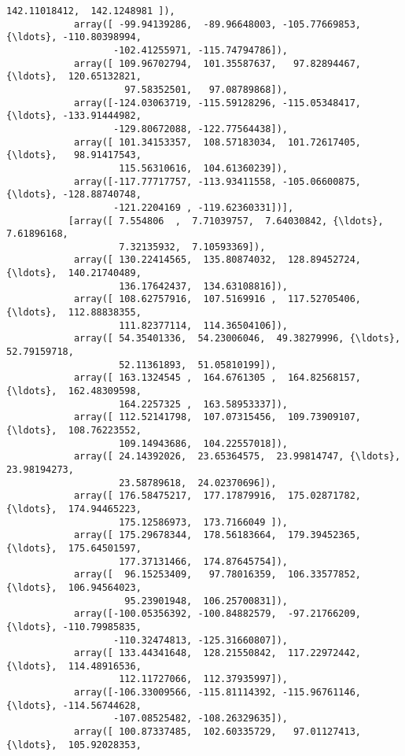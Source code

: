 \documentclass[11pt]{article}
\begin{document}
\begin{Verbatim}[commandchars=\\\{\}]
                    142.11018412,  142.1248981 ]),
            array([ -99.94139286,  -89.96648003, -105.77669853, {\ldots}, -110.80398994,
                   -102.41255971, -115.74794786]),
            array([ 109.96702794,  101.35587637,   97.82894467, {\ldots},  120.65132821,
                     97.58352501,   97.08789868]),
            array([-124.03063719, -115.59128296, -115.05348417, {\ldots}, -133.91444982,
                   -129.80672088, -122.77564438]),
            array([ 101.34153357,  108.57183034,  101.72617405, {\ldots},   98.91417543,
                    115.56310616,  104.61360239]),
            array([-117.77717757, -113.93411558, -105.06600875, {\ldots}, -128.88740748,
                   -121.2204169 , -119.62360331])],
           [array([ 7.554806  ,  7.71039757,  7.64030842, {\ldots},  7.61896168,
                    7.32135932,  7.10593369]),
            array([ 130.22414565,  135.80874032,  128.89452724, {\ldots},  140.21740489,
                    136.17642437,  134.63108816]),
            array([ 108.62757916,  107.5169916 ,  117.52705406, {\ldots},  112.88838355,
                    111.82377114,  114.36504106]),
            array([ 54.35401336,  54.23006046,  49.38279996, {\ldots},  52.79159718,
                    52.11361893,  51.05810199]),
            array([ 163.1324545 ,  164.6761305 ,  164.82568157, {\ldots},  162.48309598,
                    164.2257325 ,  163.58953337]),
            array([ 112.52141798,  107.07315456,  109.73909107, {\ldots},  108.76223552,
                    109.14943686,  104.22557018]),
            array([ 24.14392026,  23.65364575,  23.99814747, {\ldots},  23.98194273,
                    23.58789618,  24.02370696]),
            array([ 176.58475217,  177.17879916,  175.02871782, {\ldots},  174.94465223,
                    175.12586973,  173.7166049 ]),
            array([ 175.29678344,  178.56183664,  179.39452365, {\ldots},  175.64501597,
                    177.37131466,  174.87645754]),
            array([  96.15253409,   97.78016359,  106.33577852, {\ldots},  106.94564023,
                     95.23901948,  106.25700831]),
            array([-100.05356392, -100.84882579,  -97.21766209, {\ldots}, -110.79985835,
                   -110.32474813, -125.31660807]),
            array([ 133.44341648,  128.21550842,  117.22972442, {\ldots},  114.48916536,
                    112.11727066,  112.37935997]),
            array([-106.33009566, -115.81114392, -115.96761146, {\ldots}, -114.56744628,
                   -107.08525482, -108.26329635]),
            array([ 100.87337485,  102.60335729,   97.01127413, {\ldots},  105.92028353,

\end{Verbatim}
\end{document}
